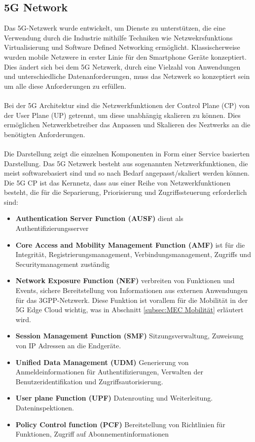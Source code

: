 \documentclass[runningheads]{llncs}
\numberwithin{figure}{section}
\begin{document}
\subsection{5G Network}
\label{subsec:5G Network}
Das 5G-Netzwerk wurde  entwickelt, um Dienste zu unterstützen, 
die eine Verwendung durch die Industrie mithilfe Techniken wie 
Netzwekrsfunktions Virtualisierung und Software Defined Networking ermöglicht.
Klassischerweise wurden mobile Netzwere in erster Linie für den Smartphone Geräte konzeptiert. 
Dies ändert sich bei dem 5G Netzwerk, durch eine Vielzahl von Anwendungen und unterschiedliche Datenanforderungen,
muss das Netzwerk so konzeptiert sein um alle diese Anforderungen zu erfüllen.
\\
\\
Bei der 5G Architektur sind die Netzwerkfunktionen der Control Plane (CP) von der User Plane (UP) getrennt, 
um diese unabhängig skalieren zu können. Dies ermöglichen Netzwerkbetreiber das Anpassen und Skalieren des Neztwerks an die
benötigten Anforderungen.
\\
\\
Die Darstellung zeigt die einzelnen Komponenten in Form einer Service basierten Darstellung.  \cite{5GCoreNetwork2017}
Das 5G Netzwerk besteht aus sogenannten Netzwerkfunktionen, die meist softwarebasiert sind und so nach Bedarf angepasst/skaliert werden können.
Die 5G CP ist das Kernnetz, dass aus einer Reihe von Netzwerkfunktionen besteht, 
die für die Separierung, Priorisierung und Zugriffssteuerung erforderlich sind:
\begin{itemize}
  \item \textbf{Authentication Server Function (AUSF)} dient als Authentifizierungsserver
  \item \textbf{Core Access and Mobility Management Function (AMF)} ist für die Integrität, Registrierungsmanagement, Verbindungsmanagement,
  Zugriffs und Securitymanagement zuständig
  \item \textbf{Network Exposure Function (NEF)} verbreiten von Funktionen und Events, 
  sichere Bereitstellung von Informationen aus externen Anwendungen für das 3GPP-Netzwerk. Diese Funktion ist vorallem für die Mobilität
  in der 5G Edge Cloud wichtig, was in Abschnitt \ref{subsec:MEC Mobilität} erläutert wird.
  \item \textbf{Session Management Function (SMF)} Sitzungsverwaltung, Zuweisung von IP Adressen an die Endgeräte. 
  \item \textbf{Unified Data Management (UDM)} Generierung von Anmeldeinformationen für Authentifizierungen, 
  Verwalten der Benutzeridentifikation und Zugriffsautorisierung.
  \item \textbf{User plane Function (UPF)} Datenrouting und Weiterleitung. Dateninspektionen.
  \item \textbf{Policy Control function (PCF)} Bereitstellung von Richtlinien für Funktionen, 
  Zugriff auf Abonnementinformationen
\end{itemize}
\end{document}
